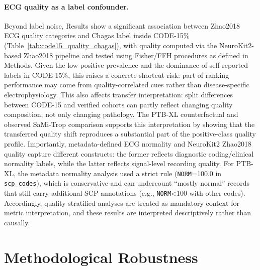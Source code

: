 \paragraph{ECG quality as a label confounder.}
Beyond label noise, Results show a significant association between Zhao2018 ECG quality categories and Chagas label inside CODE-15\% (Table~\ref{tab:code15_quality_chagas}), with quality computed via the NeuroKit2-based Zhao2018 pipeline and tested using Fisher/FFH procedures as defined in Methods.
Given the low positive prevalence and the dominance of self-reported labels in CODE-15\%, this raises a concrete shortcut risk: part of ranking performance may come from quality-correlated cues rather than disease-specific electrophysiology.
This also affects transfer interpretation: split differences between CODE-15 and verified cohorts can partly reflect changing quality composition, not only changing pathology.
The PTB-XL counterfactual and observed SaMi-Trop comparison supports this interpretation by showing that the transferred quality shift reproduces a substantial part of the positive-class quality profile.
Importantly, metadata-defined ECG normality and NeuroKit2 Zhao2018 quality capture different constructs: the former reflects diagnostic coding/clinical normality labels, while the latter reflects signal-level recording quality.
For PTB-XL, the metadata normality analysis used a strict rule (\texttt{NORM}=100.0 in \texttt{scp\_codes}), which is conservative and can undercount ``mostly normal'' records that still carry additional SCP annotations (e.g., \texttt{NORM}<100 with other codes).
Accordingly, quality-stratified analyses are treated as mandatory context for metric interpretation, and these results are interpreted descriptively rather than causally.

\section{Methodological Robustness}

